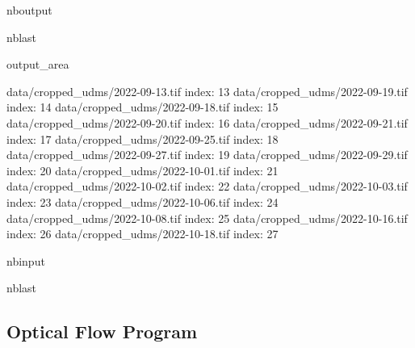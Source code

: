 \documentclass[letterpaper,10pt]{sphinxmanual}
\begin{document}
\begin{sphinxuseclass}{nboutput}
\begin{sphinxuseclass}{nblast}
{\begin{sphinxuseclass}{output_area}
\begin{sphinxuseclass}{}
\begin{sphinxVerbatim}[commandchars=\\\{\}]
data/cropped\_udms/2022-09-13.tif  index:  13
data/cropped\_udms/2022-09-19.tif  index:  14
data/cropped\_udms/2022-09-18.tif  index:  15
data/cropped\_udms/2022-09-20.tif  index:  16
data/cropped\_udms/2022-09-21.tif  index:  17
data/cropped\_udms/2022-09-25.tif  index:  18
data/cropped\_udms/2022-09-27.tif  index:  19
data/cropped\_udms/2022-09-29.tif  index:  20
data/cropped\_udms/2022-10-01.tif  index:  21
data/cropped\_udms/2022-10-02.tif  index:  22
data/cropped\_udms/2022-10-03.tif  index:  23
data/cropped\_udms/2022-10-06.tif  index:  24
data/cropped\_udms/2022-10-08.tif  index:  25
data/cropped\_udms/2022-10-16.tif  index:  26
data/cropped\_udms/2022-10-18.tif  index:  27
\end{sphinxVerbatim}



\end{sphinxuseclass}
\end{sphinxuseclass}
}

\end{sphinxuseclass}
\end{sphinxuseclass}
\begin{sphinxuseclass}{nbinput}
\begin{sphinxuseclass}{nblast}
{
\begin{sphinxVerbatim}[commandchars=\\\{\}]
\llap{\color{nbsphinxin}[ ]:\,\hspace{\fboxrule}\hspace{\fboxsep}}
\end{sphinxVerbatim}
}

\end{sphinxuseclass}
\end{sphinxuseclass}


\sphinxstepscope


\subsection{Optical Flow Program}
\label{\detokenize{notebooks/DynamicChangeDetection:optical-flow-program}}\label{\detokenize{notebooks/DynamicChangeDetection::doc}}
\sphinxAtStartPar
{}

\begin{sphinxVerbatim}[commandchars=\\\{\}]
 
 
   

\end{sphinxVerbatim}
\end{document}
